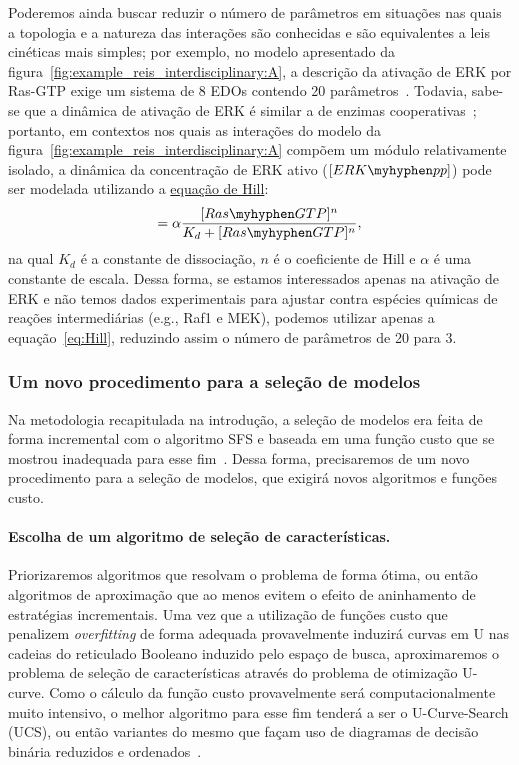 \documentclass[12pt]{article}
\begin{document}
Poderemos ainda buscar reduzir o número de parâmetros em situações nas quais a topologia e a natureza das interações são conhecidas e são equivalentes a leis cinéticas mais simples; por exemplo, no modelo apresentado da figura~\ref{fig:example_reis_interdisciplinary:A}, a descrição da ativação de ERK por Ras-GTP exige um sistema de 8 EDOs contendo 20 parâmetros~\cite{Reis2017interdisciplinary}. Todavia, sabe-se que a dinâmica de ativação de ERK é similar a de enzimas cooperativas~\cite{huang1996ultrasensitivity}; portanto, em contextos nos quais as interações do modelo da figura~\ref{fig:example_reis_interdisciplinary:A} compõem um módulo relativamente isolado, a dinâmica da concentração de ERK ativo ($[ERK \myhyphen pp]$) pode ser modelada utilizando a \href{https://en.wikipedia.org/wiki/Hill\_equation\_(biochemistry)}{equação de Hill}:
\begin{equation}
[ERK \myhyphen pp] = \alpha \frac{[Ras \myhyphen GTP]^n}{K_d + [Ras \myhyphen GTP]^n}, \label{eq:Hill}
\end{equation}
na qual $K_d$ é a constante de dissociação, $n$ é o coeficiente de Hill e $\alpha$ é uma constante de escala. Dessa forma, se estamos interessados apenas na ativação de ERK e não temos dados experimentais para ajustar contra espécies químicas de reações intermediárias (e.g., Raf1 e MEK), podemos utilizar apenas a equação~\ref{eq:Hill}, reduzindo assim o número de parâmetros de 20 para 3.

\subsubsection{Um novo procedimento para a seleção de modelos}

Na metodologia recapitulada na introdução, a seleção de modelos era feita de forma incremental com o algoritmo SFS e baseada em uma função custo que se mostrou inadequada para esse fim~\cite{Wu2015metodo}. Dessa forma, precisaremos de um novo procedimento para a seleção de modelos, que exigirá novos algoritmos e funções custo.

\paragraph{Escolha de um algoritmo de seleção de características.} Priorizaremos algoritmos que resolvam o problema de forma ótima, ou então algoritmos de aproximação que ao menos evitem o efeito de aninhamento de estratégias incrementais. Uma vez que a utilização de funções custo que penalizem {\em overfitting} de forma adequada provavelmente induzirá curvas em U nas cadeias do reticulado Booleano induzido pelo espaço de busca, aproximaremos o problema de seleção de características através do problema de otimização U-curve. Como o cálculo da função custo provavelmente será computacionalmente muito intensivo, o melhor algoritmo para esse fim tenderá a ser o U-Curve-Search (UCS), ou então variantes do mesmo que façam uso de diagramas de decisão binária reduzidos e ordenados~\cite{reis2012minimizaccao,reis2017ucsr}.
\end{document}
